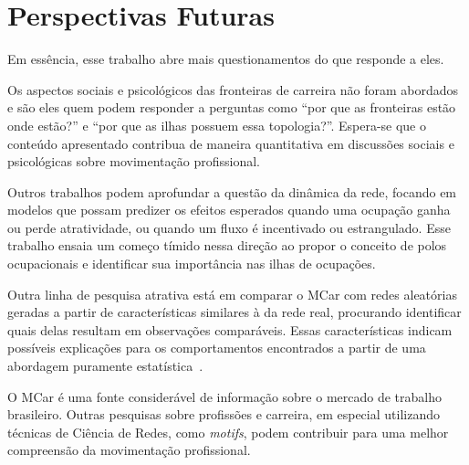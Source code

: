 \documentclass[
  article,
  11pt,
  a4paper,
  english,
  brazil,
  sumario=tradicional]{abntex2}
\begin{document}

\section{Perspectivas Futuras}

Em essência, esse trabalho abre mais questionamentos do que responde a eles.

Os aspectos sociais e psicológicos das fronteiras de carreira não foram abordados e são eles quem podem responder a perguntas como \enquote{por que as fronteiras estão onde estão?} e \enquote{por que as ilhas possuem essa topologia?}. Espera-se que o conteúdo apresentado contribua de maneira quantitativa em discussões sociais e psicológicas sobre movimentação profissional.

Outros trabalhos podem aprofundar a questão da dinâmica da rede, focando em modelos que possam predizer os efeitos esperados quando uma ocupação ganha ou perde atratividade, ou quando um fluxo é incentivado ou estrangulado. Esse trabalho ensaia um começo tímido nessa direção ao propor o conceito de polos ocupacionais e identificar sua importância nas ilhas de ocupações.

Outra linha de pesquisa atrativa está em comparar o MCar com redes aleatórias geradas a partir de características similares à da rede real, procurando identificar quais delas resultam em observações comparáveis. Essas características indicam possíveis explicações para os comportamentos encontrados a partir de uma abordagem puramente estatística~\cite{Barabasi2016-rn}.

O MCar é uma fonte considerável de informação sobre o mercado de trabalho brasileiro. Outras pesquisas sobre profissões e carreira, em especial utilizando técnicas de Ciência de Redes, como \textit{motifs}, podem contribuir para uma melhor compreensão da movimentação profissional.

\newpage


\end{document}
